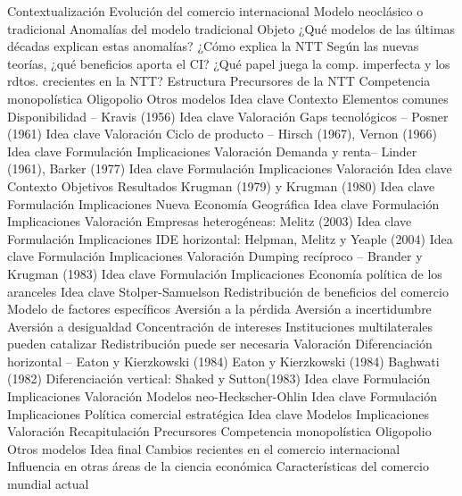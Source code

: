 \documentclass{nuevotema}
\begin{document}
\begin{esquema}[enumerate]
	\1[] 
		\2 Contextualización
			\3 Evolución del comercio internacional
			\3 Modelo neoclásico o tradicional
			\3 Anomalías del modelo tradicional
		\2 Objeto
			\3 ¿Qué modelos de las últimas décadas explican estas anomalías?
			\3 ¿Cómo explica la NTT
			\3 Según las nuevas teorías, ¿qué beneficios aporta el CI?
			\3 ¿Qué papel juega la comp. imperfecta y los rdtos. crecientes en la NTT?
		\2 Estructura
			\3 Precursores de la NTT
			\3 Competencia monopolística
			\3 Oligopolio
			\3 Otros modelos
	\1 
		\2 Idea clave
			\3 Contexto
			\3 Elementos comunes
		\2 Disponibilidad -- Kravis (1956)
			\3 Idea clave
			\3 Valoración
		\2 Gaps tecnológicos -- Posner (1961)
			\3 Idea clave
			\3 Valoración
		\2 Ciclo de producto -- Hirsch (1967), Vernon (1966)
			\3 Idea clave
			\3 Formulación
			\3 Implicaciones
			\3 Valoración
		\2 Demanda y renta-- Linder (1961), Barker (1977)
			\3 Idea clave
			\3 Formulación
			\3 Implicaciones
			\3 Valoración
	\1 
		\2 Idea clave
			\3 Contexto
			\3 Objetivos
			\3 Resultados
		\2 Krugman (1979) y Krugman (1980)
			\3 Idea clave
			\3 Formulación
			\3 Implicaciones
		\2 Nueva Economía Geográfica
			\3 Idea clave
			\3 Formulación
			\3 Implicaciones
			\3 Valoración
		\2 Empresas heterogéneas: Melitz (2003)
			\3 Idea clave
			\3 Formulación
			\3 Implicaciones
		\2 IDE horizontal: Helpman, Melitz y Yeaple (2004)
			\3 Idea clave
			\3 Formulación
			\3 Implicaciones
			\3 Valoración
	\1 
		\2 Dumping recíproco -- Brander y Krugman (1983)
			\3 Idea clave
			\3 Formulación
			\3 Implicaciones
		\2 Economía política de los aranceles
			\3 Idea clave
			\3 Stolper-Samuelson
			\3 Redistribución de beneficios del comercio
			\3 Modelo de factores específicos
			\3 Aversión a la pérdida
			\3 Aversión a incertidumbre
			\3 Aversión a desigualdad
			\3 Concentración de intereses
			\3 Instituciones multilaterales pueden catalizar
			\3 Redistribución puede ser necesaria
			\3 Valoración
		\2 Diferenciación horizontal -- Eaton y Kierzkowski (1984)
			\3 Eaton y Kierzkowski (1984)
			\3 Baghwati (1982)
		\2 Diferenciación vertical: Shaked y Sutton(1983)
			\3 Idea clave
			\3 Formulación
			\3 Implicaciones
			\3 Valoración
		\2 Modelos neo-Heckscher-Ohlin
			\3 Idea clave
			\3 Formulación
			\3 Implicaciones
		\2 Política comercial estratégica
			\3 Idea clave
			\3 Modelos
			\3 Implicaciones
			\3 Valoración
	\1[] 
		\2 Recapitulación
			\3 Precursores
			\3 Competencia monopolística
			\3 Oligopolio
			\3 Otros modelos
		\2 Idea final
			\3 Cambios recientes en el comercio internacional
			\3 Influencia en otras áreas de la ciencia económica
			\3 Características del comercio mundial actual

\end{esquema}
\end{document}
